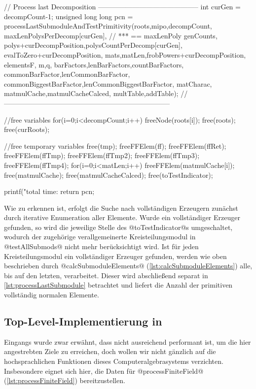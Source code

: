 \begin{ccode}[caption={[\texttt{unsigned long long processFiniteField} aus 
 \url{../Sage/enumeratePCNs.c}]Aus \url{../Sage/enumeratePCNs.c}},
  label=lst:processFiniteField]
{    // Process last Decomposition --------------------------------------------
    int curGen = decompCount-1;
    unsigned long long pcn = 
        processLastSubmoduleAndTestPrimitivity(roots,mipo,decompCount,
            maxLenPolysPerDecomp[curGen],  // *** == maxLenPoly
            genCounts,
            polys+curDecompPosition,polysCountPerDecomp[curGen],
            evalToZero+curDecompPosition,
            mats,matLen,frobPowers+curDecompPosition,
            elementsF,
            m,q,
            barFactors,lenBarFactors,countBarFactors,
            commonBarFactor,lenCommonBarFactor,
            commonBiggestBarFactor,lenCommonBiggestBarFactor,
            matCharac,
            matmulCache,matmulCacheCalced,
            multTable,addTable);
    //------------------------------------------------------------------------

    //free variables
    for(i=0;i<decompCount;i++)
        freeNode(roots[i]);
    free(roots); free(curRoots);

    //free temporary variables
    free(tmp);
    freeFFElem(ff);
    freeFFElem(ffRet);
    freeFFElem(ffTmp);
    freeFFElem(ffTmp2);
    freeFFElem(ffTmp3);
    freeFFElem(ffTmp4);
    for(i=0;i<matLen;i++) freeFFElem(matmulCache[i]);
    free(matmulCache);
    free(matmulCacheCalced);
    free(toTestIndicator);

    
    printf("total time: %
    return pcn;
}
\end{ccode}

Wie zu erkennen ist, erfolgt die Suche nach vollständigen Erzeugern zunächst
durch iterative Enumeration aller Elemente. Wurde ein vollständiger Erzeuger
gefunden, so wird die jeweilige Stelle des @toTestIndicator@s umgeschaltet,
wodurch der zugehörige verallgemeinerte Kreisteilungsmodul in 
@testAllSubmods@ nicht mehr berücksichtigt wird. Ist für jeden
Kreisteilungsmodul ein vollständiger Erzeuger gefunden, werden wie oben
beschrieben durch @calcSubmoduleElements@ (\autoref{lst:calcSubmoduleElements})
alle, bis auf den letzten, verarbeitet. Dieser wird abschließend separat in
\autoref{lst:processLastSubmodule}
betrachtet und liefert die Anzahl der primitiven vollständig normalen Elemente.


\subsection{Top-Level-Implementierung in \sage}

Eingangs wurde zwar erwähnt, dass \sage nicht ausreichend performant ist, um
die hier angestrebten Ziele zu erreichen, doch wollen wir nicht gänzlich auf
die hochsprachlichen Funktionen dieses Computeralgebrasystems verzichten.
Insbesondere eignet sich \sage hier, die Daten für
@processFiniteField@ (\autoref{lst:processFiniteField}) bereitzustellen.

